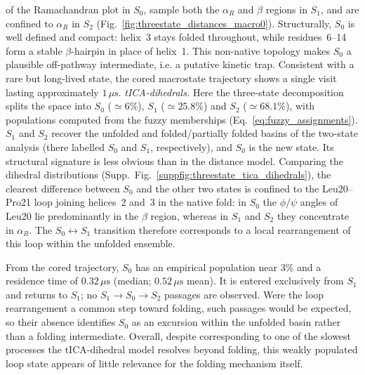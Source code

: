 \documentclass[prl,twocolumn]{revtex4-1}
\begin{document}
of the Ramachandran plot in $S_0$, sample both the $\alpha_R$ and $\beta$ regions in $S_1$, and are confined to $\alpha_R$ in $S_2$ (Fig.~\ref{fig:threestate_distances_macro0}). Structurally, $S_0$ is well defined and compact: helix~3 stays folded throughout, while residues~6--14 form a stable $\beta$-hairpin in place of helix~1. This non-native topology makes $S_0$ a plausible off-pathway intermediate, i.e. a putative kinetic trap. Consistent with a rare but long-lived state, the cored macrostate trajectory shows a single visit lasting approximately $1\,\mu\mathrm{s}$.
\smallskip \newline
\textit{tICA-dihedrals.} Here the three-state decomposition splits the space into $S_0$ ($\simeq 6\%$), $S_1$ ($\simeq 25.8\%$) and $S_2$ ($\simeq 68.1\%$), with populations computed from the fuzzy memberships (Eq.~\ref{eq:fuzzy_assignments}). $S_1$ and $S_2$ recover the unfolded and folded/partially folded basins of the two-state analysis (there labelled $S_0$ and $S_1$, respectively), and $S_0$ is the new state. Its structural signature is less obvious than in the distance model. Comparing the dihedral distributions (Supp.~Fig.~\ref{suppfig:threestate_tica_dihedrals}), the clearest difference between $S_0$ and the other two states is confined to the Leu20--Pro21 loop joining helices~2 and~3 in the native fold: in $S_0$ the $\phi/\psi$ angles of Leu20 lie predominantly in the $\beta$ region, whereas in $S_1$ and $S_2$ they concentrate in $\alpha_R$. The $S_0 \leftrightarrow S_1$ transition therefore corresponds to a local rearrangement of this loop within the unfolded ensemble.

From the cored trajectory, $S_0$ has an empirical population near $3\%$ and a residence time of $0.32\,\mu\mathrm{s}$ (median; $0.52\,\mu\mathrm{s}$ mean). It is entered exclusively from $S_1$ and returns to $S_1$; no $S_1 \rightarrow S_0 \rightarrow S_2$ passages are observed. Were the loop rearrangement a common step toward folding, such passages would be expected, so their absence identifies $S_0$ as an excursion within the unfolded basin rather than a folding intermediate. Overall, despite corresponding to one of the slowest processes the tICA-dihedral model resolves beyond folding, this weakly populated loop state appears of little relevance for the folding mechanism itself.
\end{document}
